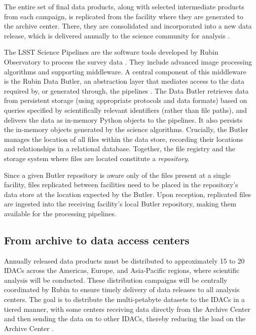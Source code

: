 \documentclass{webofc}
\begin{document}
The entire set of final data products, along with selected intermediate products from each campaign, is replicated from the facility where they are generated to the archive center. There, they are consolidated and incorporated into a new data release, which is delivered annually to the science community for analysis \cite{10.1051_epjconf_202429501042}.

The LSST Science Pipelines are the software tools developed by Rubin Observatory to process the survey data \cite{bosch-pipelines}. They include advanced image processing algorithms and supporting middleware. A central component of this middleware is the Rubin Data Butler, an abstraction layer that mediates access to the data required by, or generated through, the pipelines \cite{2022SPIE12189E..11J}. The Data Butler retrieves data from persistent storage (using appropriate protocols and data formats) based on queries specified by scientifically relevant identifiers (rather than file paths), and delivers the data as in-memory Python objects to the pipelines. It also persists the in-memory objects generated by the science algorithms. Crucially, the Butler manages the location of all files within the data store, recording their locations and relationships in a relational database. Together, the file registry and the storage system where files are located constitute a \emph{repository}.

Since a given Butler repository is aware only of the files present at a single facility, files replicated between facilities need to be placed in the repository's data store at the location expected by the Butler. Upon reception, replicated files are ingested into the receiving facility's local Butler repository, making them available for the processing pipelines.


\subsection{From archive to data access centers}
\label{summit-to-data-access-centers}

Annually released data products must be distributed to approximately 15 to 20 IDACs across the Americas, Europe, and Asia-Pacific regions, where scientific analysis will be conducted. These distribution campaigns will be centrally coordinated by Rubin to ensure timely delivery of data releases to all analysis centers. The goal is to distribute the multi-petabyte datasets to the IDACs in a tiered manner, with some centers receiving data directly from the Archive Center and then sending the data on to other IDACs, thereby reducing the load on the Archive Center \cite{RTN-086}.
\end{document}
